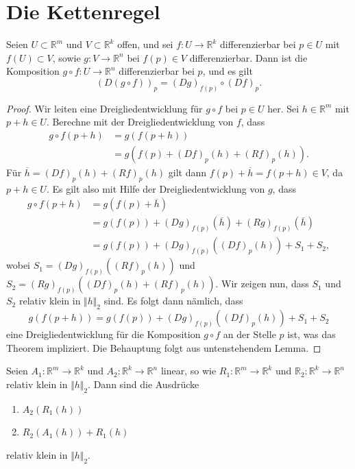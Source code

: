 \documentclass[../main.tex]{subfiles}
\begin{document}
\section{Die Kettenregel}
\begin{theorem*}[Kettenregel]
  Seien $U \subset \mathbb{R}^m$ und $V \subset \mathbb{R}^k$ 
  offen, und sei $f \colon U \to \mathbb{R}^k$ differenzierbar
  bei $p \in U$ mit $f(U) \subset V$,
  sowie $g \colon V \to \mathbb{R}^n$ bei $f(p) \in V$ 
  differenzierbar.
  Dann ist die Komposition $g \circ f \colon U \to \mathbb{R}^n$ 
  differenzierbar bei $p$, und es gilt
  \[
    {(D(g \circ f))}_p = {(Dg)}_{f(p)} \circ {(Df)}_p.
  \]
\end{theorem*}

\begin{proof}
  Wir leiten eine Dreigliedentwicklung
  für $g \circ f$ bei $p \in U$ her.
  Sei $h \in \mathbb{R}^m$ mit $p + h \in U$.
  Berechne mit der Dreigliedentwicklung von $f$, dass
  \begin{align*}
    g \circ f ( p + h)
    & = g ( f ( p + h ))\\
    &= g(f(p) + {(Df)}_p(h) + {(Rf)}_p(h)).
  \end{align*}
  Für $\overline h = {(Df)}_p(h) + {(Rf)}_p(h)$ gilt dann
  $f(p) + \overline h = f(p+h) \in V$, da $p + h \in U$.
  Es gilt also mit Hilfe der Dreigliedentwicklung von $g$, dass
  \begin{align*}
    g \circ f(p+h)
    & = g(f(p) + \overline h) \\
    &= g(f(p)) + {(Dg)}_{f(p)}(\overline h) + {(Rg)}_{f(p)}(\overline h) \\
    &= g(f(p)) + {(Dg)}_{f(p)}({(Df)}_p(h)) + S_1 + S_2,
  \end{align*}
  wobei $S_1 = {(Dg)}_{f(p)}({(Rf)}_p(h))$ und
  $S_2 = {(Rg)}_{f(p)}({(Df)}_p(h) + {(Rf)}_p(h))$.
  Wir zeigen nun, dass $S_1$ und $S_2$ relativ klein
  in $\Vert h \Vert_2$ sind.
  Es folgt dann nämlich, dass
  \[
    g(f(p + h)) = g(f(p)) + {(Dg)}_{f(p)}({(Df)}_p(h)) + S_1 + S_2
  \]
  eine Dreigliedentwicklung für die Komposition
  $g \circ f$ an der Stelle $p$ ist,
  was das Theorem impliziert.
  Die Behauptung folgt aus untenstehendem Lemma.
\end{proof}

\begin{lemma*}
  Seien $A_1 \colon \mathbb{R}^m \to \mathbb{R}^k$ 
  und $A_2 \colon \mathbb{R}^k \to \mathbb{R}^n$ linear,
  so wie $R_1 \colon \mathbb{R}^m \to \mathbb{R}^k$ 
  und $\mathbb{R}_2 \colon \mathbb{R}^k \to \mathbb{R}^n$ 
  relativ klein in $\Vert h \Vert_2$.
  Dann sind die Ausdrücke
  \begin{enumerate}[\normalfont(i)]
    \item $A_2(R_1(h))$ 
    \item $R_2(A_1(h)) + R_1(h)$
  \end{enumerate}
  relativ klein in $\Vert h \Vert_2$.
\end{lemma*}
\end{document}
